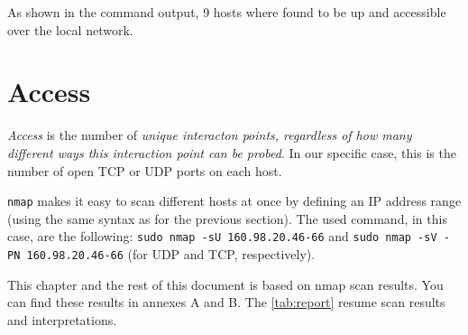 \documentclass[10pt,a4paper,twoside,onecolumn]{article}
\begin{document}
As shown in the command output, 9 hosts where found to be up and accessible over the local network.


\section{Access}

\textit{Access} is the number of \textit{unique interacton points, regardless of how many different ways this interaction point can be probed}. In our specific case, this is the number of open TCP or UDP ports on each host.

\texttt{nmap} makes it easy to scan different hosts at once by defining an IP address range (using the same syntax as for the previous section). The used command, in this case, are the following: \texttt{sudo nmap -sU 160.98.20.46-66} and \texttt{sudo nmap -sV -PN 160.98.20.46-66} (for UDP and TCP, respectively).

This chapter and the rest of this document is based on nmap scan results. You can find these results in annexes A and B. The \autoref{tab:report} resume scan results and interpretations.
\end{document}
